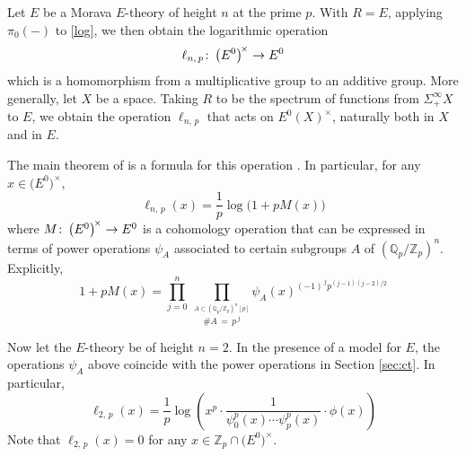\documentclass{gtpart}
\theoremstyle{definition}
\theoremstyle{remark}
\def\co{\colon\thinspace}
\newcommand{\mb}[1]{\mathbb{#1}}
\newcommand{\BQ}{{\mb Q}}
\newcommand{\BZ}{{\mb Z}}
\renewcommand{\=}{\approx}
\renewcommand{\-}{\sim}
\numberwithin{equation}{section}
\begin{document}
Let $E$ be a Morava $E$-theory of height $n$ at the prime $p$.  With $R = E$, 
applying $\pi_0(-)$ to \eqref{log}, we then obtain the logarithmic operation 
\[
 \ell_{n,\,p} \co \big( E^0 \big)^{\!\times} \to E^0 
\]
which is a homomorphism from a multiplicative group to an additive group.  More 
generally, let $X$ be a space.  Taking $R$ to be the spectrum of functions from 
$\Sigma^\infty_+ X$ to $E$, we obtain the operation $\ell_{n,\,p}$ that acts on 
$E^0(X)^\times$, naturally both in $X$ and in $E$.  

The main theorem of \cite{log} is a formula for this operation 
\cite[Theorem 1.11]{log}.  In particular, for any 
$x \in \big( E^0 \big)^{\!\times}$, 
\begin{equation}
 \label{M}
 \ell_{n,\,p}(x) = \frac{1}{p} \log\big(1 + p M(x)\big) 
\end{equation}
where $M \co \big( E^0 \big)^{\!\times} \to E^0$ is a cohomology operation that 
can be expressed in terms of power operations $\psi_A$ associated to certain 
subgroups $A$ of $(\BQ_p/\BZ_p)^n$.  Explicitly, 
\[
 1 + p M(x) = \prod_{j=0}^n ~ \prod_{\stackrel{\scriptstyle A \subset 
 (\BQ_p/\BZ_p)^n [p]}{\#A \, = \, p^{\,j}}} 
 \psi_A(x)^{(-1)^{\,j} p^{(j-1)(j-2)/2}} 
\]

Now let the $E$-theory be of height $n = 2$.  In the presence of a model for 
$E$, the operations $\psi_A$ above coincide with the power operations in Section 
\ref{sec:ct}.  In particular, 
\begin{equation}
 \label{l2p}
 \ell_{2,\,p}(x) = \frac{1}{p} \log \left( x^p \cdot 
 \frac{1}{\psi^p_0(x) \cdots \psi^p_p(x)} \cdot \phi(x) \right) 
\end{equation}
Note that $\ell_{2,\,p}(x) = 0$ for any 
$x \in \BZ_p \cap \big( E^0 \big)^{\!\times}$.  
\end{document}
